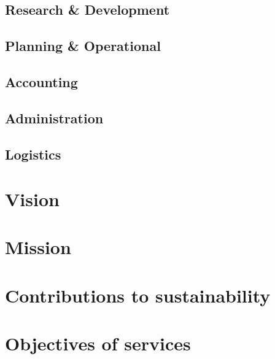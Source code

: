 \subsection{Research \& Development}
\subsection{Planning \& Operational}
\subsection{Accounting}
\subsection{Administration}
\subsection{Logistics}\label{org-logistics}
\section{Vision}
\section{Mission}
\section{Contributions to sustainability}
\section{Objectives of services}
